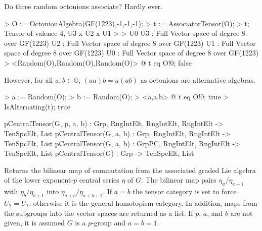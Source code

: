 \begin{example}[AssociatorFromAlgebra]

Do three random octonions associate? Hardly ever.

\begin{code}
> O := OctonionAlgebra(GF(1223),-1,-1,-1);
> t := AssociatorTensor(O);
> t;
Tensor of valence 4, U3 x U2 x U1 >-> U0
U3 : Full Vector space of degree 8 over GF(1223)
U2 : Full Vector space of degree 8 over GF(1223)
U1 : Full Vector space of degree 8 over GF(1223)
U0 : Full Vector space of degree 8 over GF(1223)
> <Random(O),Random(O),Random(O)> @ t eq O!0;
false
\end{code}

However, for all $a,b\in\mathbb{O}$, $(aa)b=a(ab)$ as octonions are alternative algebras.

\begin{code}
> a := Random(O); 
> b := Random(O); 
> <a,a,b> @ t eq O!0;
true
> IsAlternating(t);
true
\end{code}
\end{example}


\begin{intrinsics}
pCentralTensor(G, p, a, b) : Grp, RngIntElt, RngIntElt, RngIntElt -> TenSpcElt, List
pCentralTensor(G, a, b) : Grp, RngIntElt, RngIntElt -> TenSpcElt, List
pCentralTensor(G, a, b) : GrpPC, RngIntElt, RngIntElt -> TenSpcElt, List
pCentralTensor(G) : Grp -> TenSpcElt, List
\end{intrinsics}

Returns the bilinear map of commutation from the associated graded Lie algebra
of the lower exponent-$p$ central series $\eta$ of $G$.  The bilinear map pairs
$\eta_a/\eta_{a+1}$ with $ \eta_{b}/\eta_{b+1}$ into $\eta_{a+b}/\eta_{a+b+1}$.
If $a=b$ the tensor category is set to force $U_2=U_1$; otherwise it is the
general homotopism category. In addition, maps from the subgroups into the
vector spaces are returned as a list. If $p$, $a$, and $b$ are not given, it is
assumed $G$ is a $p$-group and $a=b=1$.

